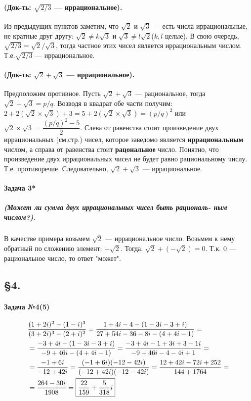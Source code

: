 \documentclass[a4paper,12pt]{report}
\begin{document}
\paragraph{(Док-ть: $ \sqrt{2/3} $ --- иррациональное).}
Из предыдущих пунктов заметим, что $ \sqrt{2} $ и
$ \sqrt{3} $ --- есть числа иррациональные, 
не кратные друг другу: $ \sqrt{2} \ne k\sqrt{3} $ и
$ \sqrt{3} \ne l\sqrt{2} $($k, l $ целые).
В свою очередь, $ \sqrt{2/3}=\sqrt{2}/\sqrt{3} $, тогда
частное этих чисел является иррациональным числом.
Т.е.$ \sqrt{2/3} $ --- иррациональное.

\paragraph{(Док-ть: $ \sqrt{2} + \sqrt{3} $ --- иррациональное).}
Предположим противное.
Пусть $ \sqrt{2} + \sqrt{3} $ --- рациональное, тогда
$ \sqrt{2} + \sqrt{3} = p/q $. Возводя в квадрат обе части получим: 
$ 2 + 2(\sqrt{2} \times \sqrt{3}) + 3 = 
5 + 2(\sqrt{2} \times \sqrt{3}) = (p/q)^2 $ или 
$ \sqrt{2} \times \sqrt{3} = \dfrac{(p/q)^2 - 5}{2} $.  
Слева от равенства стоит произведение двух иррациональных (см.стр.\pageref{sqrt2}) чисел, которое
заведомо является \textbf{иррациональным} числом,
а справа от равенства стоит \textbf{рацональное} число.
Понятно, что произведение двух иррациональных чисел 
не будет равно рациональному числу. Т.е. противоречие.
Следовательно, $ \sqrt{2} + \sqrt{3} $ --- иррациональное.

\paragraph{Задача 3*}
\subparagraph{(Может ли сумма двух иррациональных чисел быть рациональ-	ным числом?).} 
В качестве примера возьмем $ \sqrt{2} $ --- иррациональное число.
Возьмем к нему обратный по сложению элемент: $ -\sqrt{2} $. Тогда,
$ \sqrt{2} + (-\sqrt{2}) = 0 $. Т.к. 0 --- рациональное число, то 
ответ "может".

\subsection{\S4.\\}

\paragraph{Задача №4(5)}

\begin{align*}
	&\dfrac{(1+2i)^2-(1-i)^3}{(3+2i)^3-(2+i)^2}=
	\dfrac{1+4i-4-(1-3i-3+i)}{27+54i-36-8i-(4+4i-1)}=\\
	&=\dfrac{-3+4i-(1-3i-3+i)}{-9+46i-(4+4i-1)}=
	\dfrac{-3+4i-1+3i+3-1i}{-9+46i-4-4i+1}=\\
	&=\dfrac{-1+6i}{-12+42i}=
	\dfrac{(-1+6i)(-12-42i)}{(-12+42i)(-12-42i)}=
	\dfrac{12+42i-72i+252}{144+1764}=\\
	&=\dfrac{264-30i}{1908}=
	\fbox{$ \dfrac{22}{159}+\dfrac{5}{318}i $} 
\end{align*}
\end{document}
